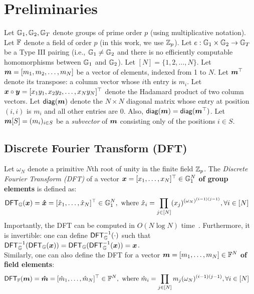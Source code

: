\section{Preliminaries}

Let $\mathbb{G}_1, \mathbb{G}_2, \mathbb{G}_T$ denote groups of prime order $p$ (using multiplicative notation).
Let $\mathbb{F}$ denote a field of order $p$ (in this work, we use $\mathbb{Z}_p$).
Let $e : \mathbb{G}_1 \times \mathbb{G}_2\rightarrow \mathbb{G}_T$~\cite{GPS08} be a Type III pairing (i.e., $\mathbb{G}_1\ne \mathbb{G}_2$ and there is no efficiently computable homomorphisms between $\mathbb{G}_1$ and $\mathbb{G}_2$).
Let $[N] = \{1,2,\dots, N\}$.
Let $\bm{m}=[m_1, m_2, \dots, m_N]$ be a vector of elements, indexed from 1 to $N$.
Let $\bm{m}^\top$ denote its transpose: a column vector whose $i$th entry is $m_i$.
Let $\bm{x}\circ\bm{y} = [x_1 y_1, x_2 y_2,\dots, x_N y_N]^\top$ denote the Hadamard product of two column vectors.
Let $\mathsf{diag}(\bm{m})$ denote the $N\times N$ diagonal matrix whose entry at position $(i,i)$ is $m_i$ and all other entries are 0.
Also, $\mathsf{diag}(\bm{m})=\mathsf{diag}(\bm{m}^\top)$.
Let $\bm{m}[S] = (m_i)_{i \in S}$ be a \textit{subvector} of $\bm{m}$ consisting only of the positions $i\in S$.

\subsection{Discrete Fourier Transform (DFT)}
\label{s:dft}

Let $\omega_N$ denote a primitive $N$th root of unity in the finite field $\mathbb{Z}_p$.
The \textit{Discrete Fourier Transform (DFT)} of a vector $\bm{x} = [x_1,\dots,x_N]^\top \in \mathbb{G}_1^N$ \textbf{of group elements} is defined as:
\begin{align}
    \mathsf{DFT}_{\mathbb{G}}(\bm{x}) &= \bm{\hat{x}} = [\hat{x}_1, \dots, \hat{x}_N]^\top\in \mathbb{G}_1^N,\ \text{where}\ \hat{x}_i= \prod_{j\in [N]} (x_j)^{(\omega_N)^{(i-1)(j-1)}},\forall i\in[N]
\end{align}
Importantly, the DFT can be computed in $O(N\log{N})$ time~\cite{CLRS09}.
Furthermore, it is invertible: one can define $\mathsf{DFT}_{\mathbb{G}}^{-1}(\cdot)$ such that $\mathsf{DFT}_{\mathbb{G}}^{-1}(\mathsf{DFT}_{\mathbb{G}}(\bm{x})) = \mathsf{DFT}_{\mathbb{G}}(\mathsf{DFT}_{\mathbb{G}}^{-1}(\bm{x})) = \bm{x}$.
\\

\noindent Similarly, one can also define the DFT for a vector $\bm{m}=[m_1,\dots,m_N]\in \mathbb{F}^N$ \textbf{of field elements}:
\begin{align}
    \mathsf{DFT}_{\mathbb{F}}(\bm{m}) &= \bm{\hat{m}} = [\hat{m}_1, \dots, \hat{m}_N]^\top\in \mathbb{F}^N,\ \text{where}\ \hat{m}_i= \prod_{j\in [N]} m_j (\omega_N)^{(i-1)(j-1)},\forall i\in[N]
\end{align}

